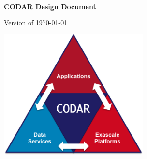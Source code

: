 
{\em \ }

\vspace{0.1in}

\begin{center}

{\Large \textbf{CODAR Design Document}}

\vspace{0.3in}

{\huge \textbf{\TITLE{}}}

\vspace{0.2in}

\large{Version of \today}

\end{center}

\vspace{0.2in}

\begin{center}
\AUTHORS{}
\end{center}

\vspace{2in}

\begin{center}
\includegraphics[width=3in]{Figs/CODAR.png}
\end{center}

\vspace{1in}


